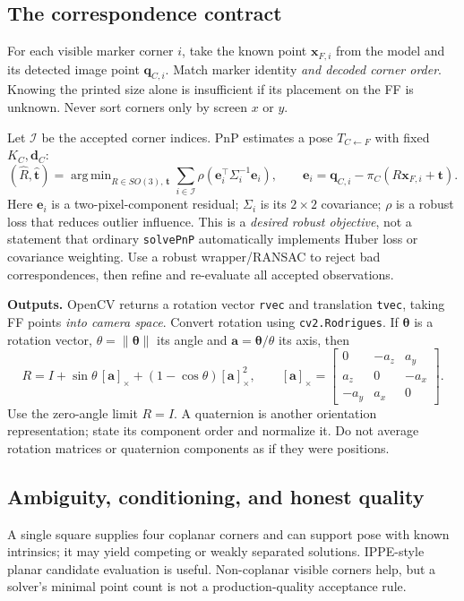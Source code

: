 \documentclass[11pt,a4paper]{article}
\newcommand{\T}[2]{T_{#1\leftarrow #2}}
\newcommand{\pt}[1]{\bm{x}_{#1}}
\newcommand{\sk}[1]{[#1]_\times}
\DeclareMathOperator*{\argmin}{arg\,min}
\begin{document}
\subsection{The correspondence contract}
For each visible marker corner $i$, take the known point $\pt{F,i}$ from
the model and its detected image point $\bm{q}_{C,i}$.
Match marker identity \emph{and decoded corner order}.
Knowing the printed size alone is insufficient if its placement on the
FF is unknown. Never sort corners only by screen $x$ or $y$.

Let $\mathcal{I}$ be the accepted corner indices.
PnP estimates a pose $\T{C}{F}$ with fixed $K_C,\bm{d}_C$:
\begin{equation}
(\hat R,\hat{\bm{t}})
=\argmin_{R\in SO(3),\,\bm{t}}
\sum_{i\in\mathcal I}
\rho\!\left(
\bm{e}_i^\top\Sigma_i^{-1}\bm{e}_i
\right),\qquad
\bm{e}_i=\bm{q}_{C,i}-\pi_C(R\pt{F,i}+\bm{t}).
\label{eq:pnp}
\end{equation}
Here $\bm{e}_i$ is a two-pixel-component residual; $\Sigma_i$ is its
$2\times2$ covariance; $\rho$ is a robust loss that reduces outlier influence.
This is a \emph{desired robust objective}, not a statement that ordinary
\texttt{solvePnP} automatically implements Huber loss or covariance weighting.
Use a robust wrapper/RANSAC to reject bad correspondences, then refine
and re-evaluate all accepted observations.

\textbf{Outputs.} OpenCV returns a rotation vector \texttt{rvec} and
translation \texttt{tvec}, taking FF points \emph{into camera space}.
Convert rotation using \texttt{cv2.Rodrigues}. If $\bm{\theta}$ is a
rotation vector, $\theta=\|\bm{\theta}\|$ its angle and
$\bm{a}=\bm{\theta}/\theta$ its axis, then
\begin{equation}
R=I+\sin\theta\,\sk{\bm{a}}+(1-\cos\theta)\sk{\bm{a}}^2,\qquad
\sk{\bm{a}}=
\begin{bmatrix}0&-a_z&a_y\\a_z&0&-a_x\\-a_y&a_x&0\end{bmatrix}.
\end{equation}
Use the zero-angle limit $R=I$. A quaternion is another orientation
representation; state its component order and normalize it. Do not average
rotation matrices or quaternion components as if they were positions.

\subsection{Ambiguity, conditioning, and honest quality}
A single square supplies four coplanar corners and can support pose with
known intrinsics; it may yield competing or weakly separated solutions.
IPPE-style planar candidate evaluation is useful.
Non-coplanar visible corners help, but a solver's minimal point count is
not a production-quality acceptance rule.
\end{document}
